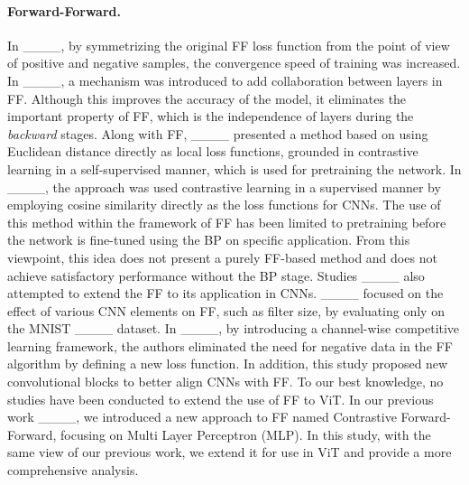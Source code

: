 \paragraph{Forward-Forward.} In ____, by symmetrizing the original FF loss function from the point of view of positive and negative samples, the convergence speed of training was increased. In ____, a mechanism was introduced to add collaboration between layers in FF. Although this improves the accuracy of the model, it eliminates the important property of FF, which is the independence of layers during the \textit{backward} stages. Along with FF, ____ presented a method based on using Euclidean distance directly as local loss functions, grounded in contrastive learning in a self-supervised manner, which is used for pretraining the network. In ____, the approach was used contrastive learning in a supervised manner by employing cosine similarity directly as the loss functions for CNNs. The use of this method within the framework of FF has been limited to pretraining before the network is fine-tuned using the BP on specific application. From this viewpoint, this idea does not present a purely FF-based method and does not achieve satisfactory performance without the BP stage. Studies ____ also attempted to extend the FF to its application in CNNs. ____ focused on the effect of various CNN elements on FF, such as filter size, by evaluating only on the MNIST ____ dataset. In ____, by introducing a channel-wise competitive learning framework, the authors eliminated the need for negative data in the FF algorithm by defining a new loss function. In addition, this study proposed new convolutional blocks to better align CNNs with FF. To our best knowledge, no studies have been conducted to extend the use of FF to ViT. In our previous work ____, we introduced a new approach to FF named Contrastive Forward-Forward, focusing on Multi Layer Perceptron (MLP). In this study, with the same view of our previous work, we extend it for use in ViT and provide a more comprehensive analysis.